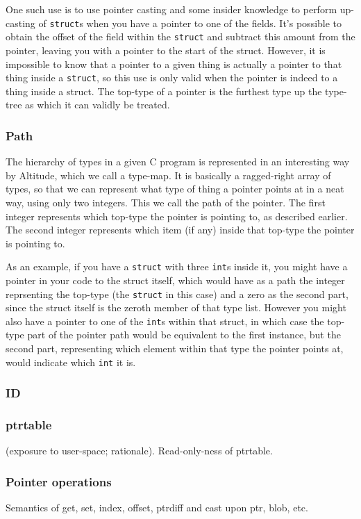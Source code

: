 One such use is to use pointer casting and some insider knowledge to perform up-casting of {\tt struct}s when you have a pointer to one of the fields. It's possible to obtain the offset of the field within the {\tt struct} and subtract this amount from the pointer, leaving you with a pointer to the start of the struct. However, it is impossible to know that a pointer to a given thing is actually a pointer to that thing inside a {\tt struct}, so this use is only valid when the pointer is indeed to a thing inside a struct. The top-type of a pointer is the furthest type up the type-tree as which it can validly be treated.

\subsubsection{Path}
The hierarchy of types in a given C program is represented in an interesting way by Altitude, which we call a type-map. It is basically a ragged-right array of types, so that we can represent what type of thing a pointer points at in a neat way, using only two integers. This we call the path of the pointer. The first integer represents which top-type the pointer is pointing to, as described earlier. The second integer represents which item (if any) inside that top-type the pointer is pointing to.

As an example, if you have a {\tt struct} with three {\tt int}s inside it, you might have a pointer in your code to the struct itself, which would have as a path the integer reprsenting the top-type (the {\tt struct} in this case) and a zero as the second part, since the struct itself is the zeroth member of that type list. However you might also have a pointer to one of the {\tt int}s within that struct, in which case the top-type part of the pointer path would be equivalent to the first instance, but the second part, representing which element within that type the pointer points at, would indicate which {\tt int} it is.
\subsubsection{ID}
\subsubsection{ptrtable}

(exposure to user-space; rationale). Read-only-ness of ptrtable.
\subsubsection{Pointer operations}
Semantics of get, set, index, offset, ptrdiff and cast upon ptr, blob, etc.
